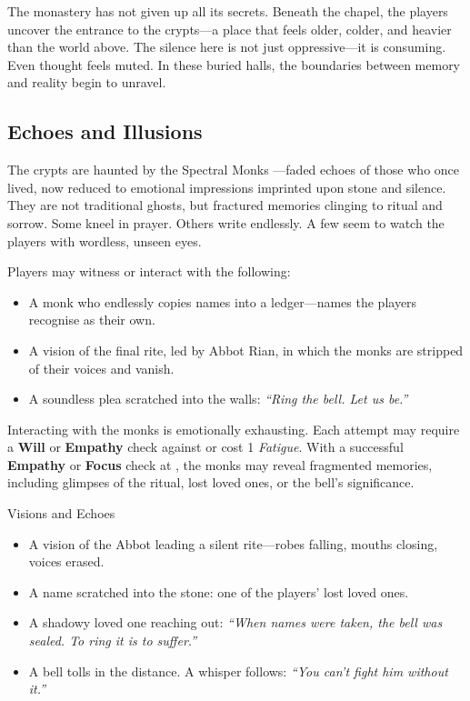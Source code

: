 The monastery has not given up all its secrets. Beneath the chapel, the players uncover the entrance to the crypts—a place that feels older, colder, and heavier than the world above. The silence here is not just oppressive—it is consuming. Even thought feels muted. In these buried halls, the boundaries between memory and reality begin to unravel.

\subsection{Echoes and Illusions}

The crypts are haunted by the Spectral Monks —faded echoes of those who once lived, now reduced to emotional impressions imprinted upon stone and silence. They are not traditional ghosts, but fractured memories clinging to ritual and sorrow. Some kneel in prayer. Others write endlessly. A few seem to watch the players with wordless, unseen eyes.

Players may witness or interact with the following:
\begin{Example}{}
    \begin{itemize}\raggedright
        \item A monk who endlessly copies names into a ledger—names the players recognise as their own.
        \item A vision of the final rite, led by Abbot Rian, in which the monks are stripped of their voices and vanish.
        \item A soundless plea scratched into the walls: \emph{“Ring the bell. Let us be.”}
    \end{itemize}
\end{Example}

Interacting with the monks is emotionally exhausting. Each attempt may require a \textbf{Will} or \textbf{Empathy} check against  or cost 1 \emph{Fatigue}. With a successful \textbf{Empathy} or \textbf{Focus} check at , the monks may reveal fragmented memories, including glimpses of the ritual, lost loved ones, or the bell’s significance.

\begin{Example}{Visions and Echoes}
    \begin{itemize}
        \item A vision of the Abbot leading a silent rite—robes falling, mouths closing, voices erased.
        \item A name scratched into the stone: one of the players’ lost loved ones.
        \item A shadowy loved one reaching out: \emph{“When names were taken, the bell was sealed. To ring it is to suffer.”}
        \item A bell tolls in the distance. A whisper follows: \emph{“You can’t fight him without it.”}
    \end{itemize}
\end{Example}

